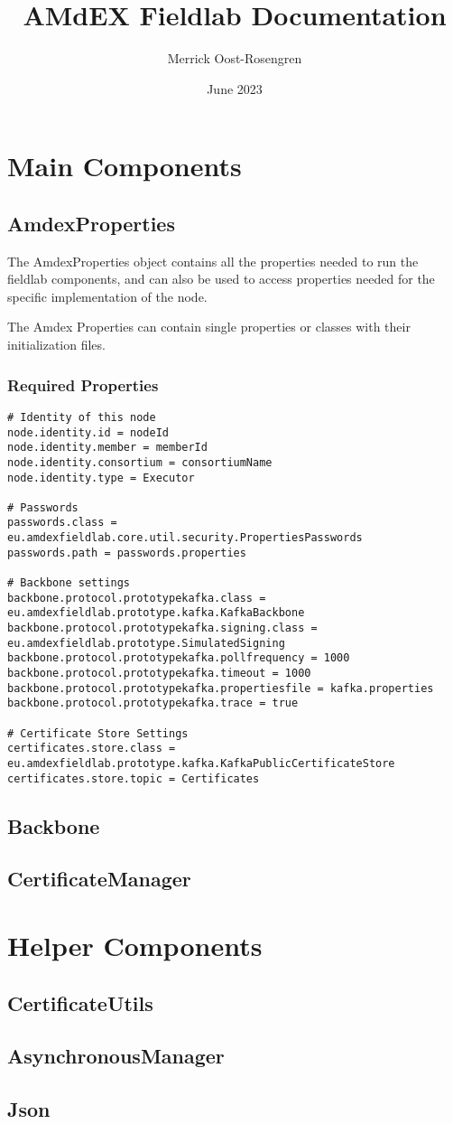 \documentclass{article}
\title{AMdEX Fieldlab Documentation}
\author{Merrick Oost-Rosengren}
\date{June 2023}
\begin{document}
\maketitle

\section{Main Components}
\subsection{AmdexProperties}
The AmdexProperties object contains all the properties needed to run the fieldlab components, and can also be used to access properties needed for the specific implementation of the node.

The Amdex Properties can contain single properties or classes with their initialization files.
\subsubsection{Required Properties}
\begin{verbatim}
# Identity of this node
node.identity.id = nodeId
node.identity.member = memberId
node.identity.consortium = consortiumName
node.identity.type = Executor

# Passwords
passwords.class = eu.amdexfieldlab.core.util.security.PropertiesPasswords
passwords.path = passwords.properties

# Backbone settings
backbone.protocol.prototypekafka.class = eu.amdexfieldlab.prototype.kafka.KafkaBackbone
backbone.protocol.prototypekafka.signing.class = eu.amdexfieldlab.prototype.SimulatedSigning
backbone.protocol.prototypekafka.pollfrequency = 1000
backbone.protocol.prototypekafka.timeout = 1000
backbone.protocol.prototypekafka.propertiesfile = kafka.properties
backbone.protocol.prototypekafka.trace = true

# Certificate Store Settings
certificates.store.class = eu.amdexfieldlab.prototype.kafka.KafkaPublicCertificateStore
certificates.store.topic = Certificates

\end{verbatim}
\subsection{Backbone}
\subsection{CertificateManager}
\section{Helper Components}
\subsection{CertificateUtils}
\subsection{AsynchronousManager}
\subsection{Json}
\end{document}
